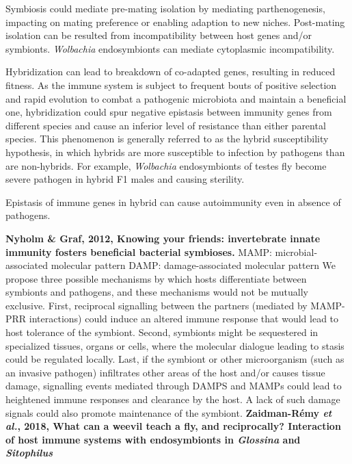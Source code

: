 \documentclass[11pt]{article}
\begin{document}
\begin{sloppypar}
\par
Symbiosis could mediate pre-mating isolation by mediating parthenogenesis, impacting on mating preference or enabling adaption to new niches. 
Post-mating isolation can be resulted from incompatibility between host genes and/or symbionts. 
\textit{Wolbachia} endosymbionts can mediate cytoplasmic incompatibility. 
\par
Hybridization can lead to breakdown of co-adapted genes, resulting in reduced fitness. 
As the immune system is subject to frequent bouts of positive selection and rapid evolution to combat a pathogenic microbiota and maintain a beneficial one, hybridization could spur negative epistasis between immunity genes from different species and cause an inferior level of resistance than either parental species. This phenomenon is generally referred to as the hybrid susceptibility hypothesis, in which hybrids are more susceptible to infection by pathogens than are non-hybrids. 
For example, \textit{Wolbachia} endosymbionts of testes fly become severe pathogen in hybrid F1 males and causing sterility. 
\par
Epistasis of immune genes in hybrid can cause autoimmunity even in absence of pathogens. 
\par
\textbf{Nyholm & Graf, 2012, Knowing your friends: invertebrate innate immunity fosters beneficial bacterial symbioses.} \newline
MAMP: microbial-associated molecular pattern \newline
DAMP: damage-associated molecular pattern \newline
We propose three possible mechanisms by which hosts differentiate between symbionts and pathogens, and these mechanisms would not be mutually exclusive. 
First, reciprocal signalling between the partners (mediated by MAMP-PRR interactions) could induce an altered immune response that would lead to host tolerance of the symbiont. 
Second, symbionts might be sequestered in specialized tissues, organs or cells, where the molecular dialogue leading to stasis could be regulated locally. 
Last, if the symbiont or other microorganism (such as an invasive pathogen) infiltrates other areas of the host and/or causes tissue damage, signalling events mediated through DAMPS and MAMPs could lead to heightened immune responses and clearance by the host. A lack of such damage signals could also promote maintenance of the symbiont.
\textbf{Zaidman-Rémy \textit{et al.}, 2018, What can a weevil teach a fly, and reciprocally? Interaction of host immune systems with endosymbionts in \textit{Glossina} and \textit{Sitophilus}} \newline

\end{sloppypar}
\end{document}
